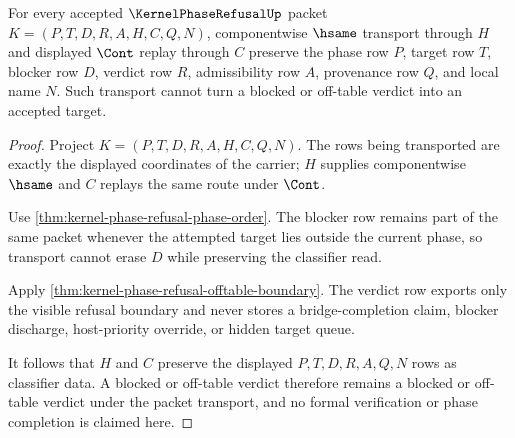 \begin{theorem}
\label{thm:kernel-phase-refusal-transport-obligation}
For every accepted $\KernelPhaseRefusalUp$ packet $K=(P,T,D,R,A,H,C,Q,N)$, componentwise $\hsame$ transport through $H$ and displayed $\Cont$ replay through $C$ preserve the phase row $P$, target row $T$, blocker row $D$, verdict row $R$, admissibility row $A$, provenance row $Q$, and local name $N$. Such transport cannot turn a blocked or off-table verdict into an accepted target.
\end{theorem}
\begin{proof}
Project $K=(P,T,D,R,A,H,C,Q,N)$. The rows being transported are exactly the displayed coordinates of the carrier; $H$ supplies componentwise $\hsame$ and $C$ replays the same route under $\Cont$.

Use \autoref{thm:kernel-phase-refusal-phase-order}. The blocker row remains part of the same packet whenever the attempted target lies outside the current phase, so transport cannot erase $D$ while preserving the classifier read.

Apply \autoref{thm:kernel-phase-refusal-offtable-boundary}. The verdict row exports only the visible refusal boundary and never stores a bridge-completion claim, blocker discharge, host-priority override, or hidden target queue.

It follows that $H$ and $C$ preserve the displayed $P,T,D,R,A,Q,N$ rows as classifier data. A blocked or off-table verdict therefore remains a blocked or off-table verdict under the packet transport, and no formal verification or phase completion is claimed here.
\end{proof}

